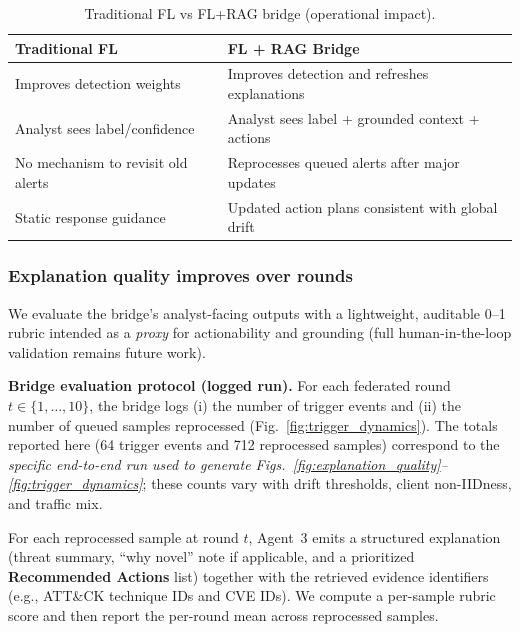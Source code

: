 \documentclass[conference]{IEEEtran}
\begin{document}
\begin{table}[t]
\caption{Traditional FL vs FL+RAG bridge (operational impact).}
\label{tab:flrag_vs_trad}
\centering
\begin{tabular}{p{}p{}}
\toprule
\textbf{Traditional FL} & \textbf{FL + RAG Bridge}\\
\midrule
Improves detection weights & Improves detection and refreshes explanations\\
Analyst sees label/confidence & Analyst sees label + grounded context + actions\\
No mechanism to revisit old alerts & Reprocesses queued alerts after major updates\\
Static response guidance & Updated action plans consistent with global drift\\
\bottomrule
\end{tabular}
\end{table}

\subsubsection{Explanation quality improves over rounds}
We evaluate the bridge’s analyst-facing outputs with a lightweight, auditable 0--1 rubric intended as a \emph{proxy} for actionability and grounding (full human-in-the-loop validation remains future work).

\textbf{Bridge evaluation protocol (logged run).} For each federated round $t\in\{1,\dots,10\}$, the bridge logs (i) the number of trigger events and (ii) the number of queued samples reprocessed (Fig.~\ref{fig:trigger_dynamics}). The totals reported here (64 trigger events and 712 reprocessed samples) correspond to the \emph{specific end-to-end run used to generate Figs.~\ref{fig:explanation_quality}--\ref{fig:trigger_dynamics}}; these counts vary with drift thresholds, client non-IIDness, and traffic mix.

For each reprocessed sample at round $t$, Agent~3 emits a structured explanation (threat summary, ``why novel'' note if applicable, and a prioritized \textbf{Recommended Actions} list) together with the retrieved evidence identifiers (e.g., ATT\&CK technique IDs and CVE IDs). We compute a per-sample rubric score and then report the per-round mean across reprocessed samples.
\end{document}
